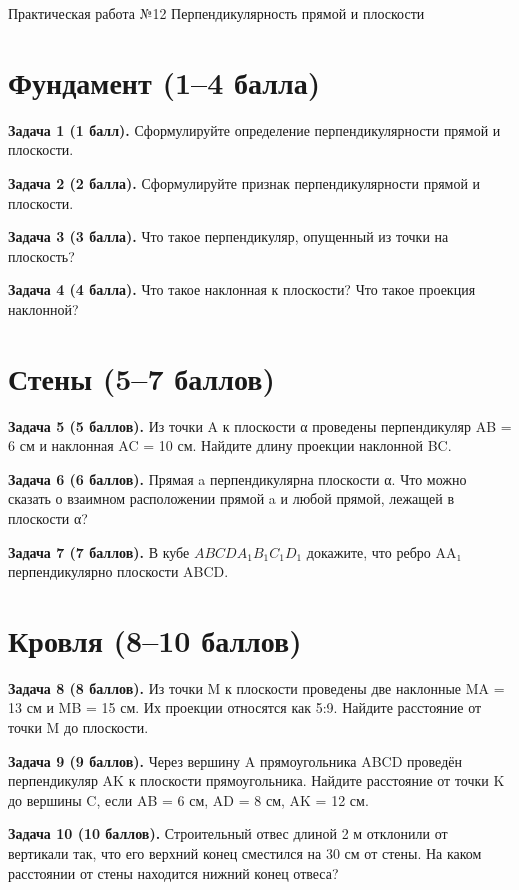 \documentclass{umk-matematika}
\begin{document}
\maketitlepage
    {Практическая работа №12}
    {Перпендикулярность прямой и плоскости}
    {}

\section{Фундамент (1--4 балла)}

\textbf{Задача 1 (1 балл).} Сформулируйте определение перпендикулярности прямой и плоскости.

\textbf{Задача 2 (2 балла).} Сформулируйте признак перпендикулярности прямой и плоскости.

\textbf{Задача 3 (3 балла).} Что такое перпендикуляр, опущенный из точки на плоскость?

\textbf{Задача 4 (4 балла).} Что такое наклонная к плоскости? Что такое проекция наклонной?

\section{Стены (5--7 баллов)}

\textbf{Задача 5 (5 баллов).} Из точки A к плоскости α проведены перпендикуляр AB = 6 см и наклонная AC = 10 см. Найдите длину проекции наклонной BC.

\textbf{Задача 6 (6 баллов).} Прямая a перпендикулярна плоскости α. Что можно сказать о взаимном расположении прямой a и любой прямой, лежащей в плоскости α?

\textbf{Задача 7 (7 баллов).} В кубе $ABCDA_1B_1C_1D_1$ докажите, что ребро AA₁ перпендикулярно плоскости ABCD.

\section{Кровля (8--10 баллов)}

\textbf{Задача 8 (8 баллов).} Из точки M к плоскости проведены две наклонные MA = 13 см и MB = 15 см. Их проекции относятся как 5:9. Найдите расстояние от точки M до плоскости.

\textbf{Задача 9 (9 баллов).} Через вершину A прямоугольника ABCD проведён перпендикуляр AK к плоскости прямоугольника. Найдите расстояние от точки K до вершины C, если AB = 6 см, AD = 8 см, AK = 12 см.

\textbf{Задача 10 (10 баллов).} Строительный отвес длиной 2 м отклонили от вертикали так, что его верхний конец сместился на 30 см от стены. На каком расстоянии от стены находится нижний конец отвеса?
\end{document}
